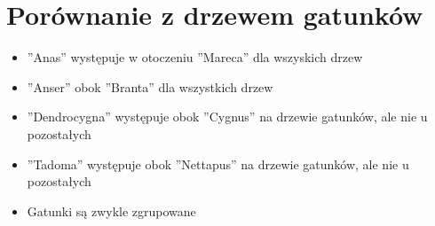 \documentclass[12pt]{article}
\begin{document}
\section{Porównanie z drzewem gatunków}
\begin{itemize}
\item ''Anas'' występuje w otoczeniu ''Mareca'' dla wszyskich drzew
\item ''Anser'' obok ''Branta'' dla wszystkich drzew
\item ''Dendrocygna'' występuje obok ''Cygnus'' na drzewie gatunków, ale nie u pozostałych
\item ''Tadoma'' występuje obok ''Nettapus'' na drzewie gatunków, ale nie u pozostałych
\item Gatunki są zwykle zgrupowane
\end{itemize}
\end{document}
